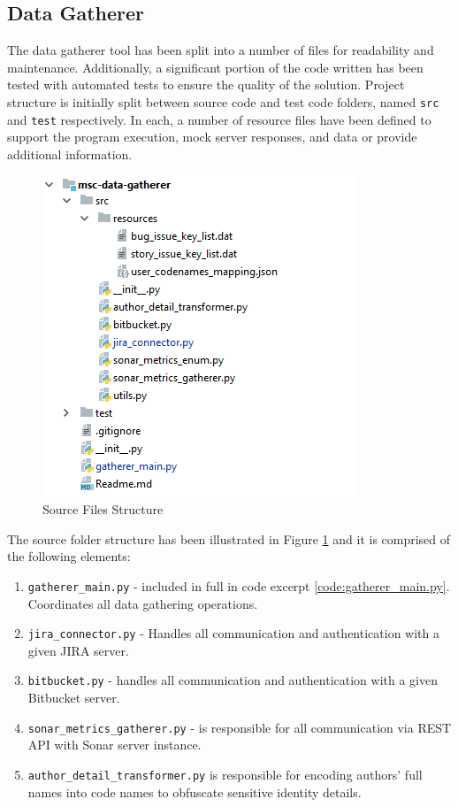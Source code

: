 \subsection{Data Gatherer}\label{sec:impl-data-gatherer}
The data gatherer tool has been split into a number of files for readability and maintenance. Additionally, a significant portion of the code written has been tested with automated tests to ensure the quality of the solution. Project structure is initially split between source code and test code folders, named \texttt{src} and \texttt{test} respectively. In each, a number of resource files have been defined to support the program execution, mock server responses, and data or provide additional information.

\begin{figure}[!h]
    \centering
    \includegraphics{Figures/impl_src_folder_files.png}
    \caption{Source Files Structure}
    \label{fig:impl-data-gatherer-source-files}
\end{figure}

The source folder structure has been illustrated in Figure \ref{fig:impl-data-gatherer-source-files} and it is comprised of the following elements:
\begin{enumerate}
    \item \texttt{gatherer\_main.py} - included in full in code excerpt \ref{code:gatherer_main.py}. Coordinates all data gathering operations. 
    \item\label{lst:impl.item:jira} \texttt{jira\_connector.py} - Handles all communication and authentication with a given JIRA server.
    \item\label{lst:impl.item:bitbucket} \texttt{bitbucket.py} - handles all communication and authentication with a given Bitbucket server.
    \item\label{lst:impl.item:sonar-metrics-gatherer} \texttt{sonar\_metrics\_gatherer.py} - is responsible for all communication via REST API with Sonar server instance.
    \item\label{lst:impl.item:author-encoder} \texttt{author\_detail\_transformer.py} is responsible for encoding authors' full names into code names to obfuscate sensitive identity details. 
\end{enumerate}

